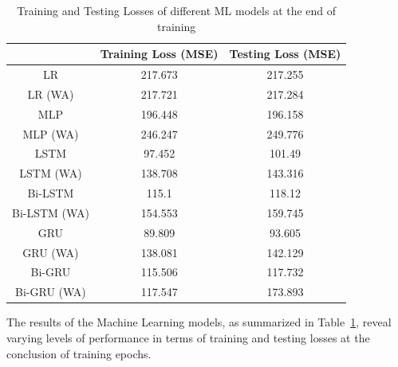 \begin{table}[p]
    \renewcommand{\arraystretch}{1.5}
    \begin{center}
        \footnotesize
        \begin{tabular}{ |c|c|c| }
            \hline
            & Training Loss (MSE)        & Testing Loss (MSE)          \\
            \hline
            LR           & \cellcolor{red!10}217.673  & \cellcolor{red!10}217.255   \\
            \hline
            LR (WA)      & \cellcolor{red!20}217.721  & \cellcolor{red!20}217.284   \\
            \hline
            MLP          & 196.448                    & 196.158                     \\
            \hline
            MLP (WA)     & \cellcolor{red!30}246.247  & \cellcolor{red!30}249.776   \\
            \hline
            LSTM         & \cellcolor{green!20}97.452 & \cellcolor{green!20}101.49  \\
            \hline
            LSTM (WA)    & 138.708                    & 143.316                     \\
            \hline
            Bi-LSTM      & \cellcolor{green!10}115.1  & 118.12                      \\
            \hline
            Bi-LSTM (WA) & 154.553                    & 159.745                     \\
            \hline
            GRU          & \cellcolor{green!30}89.809 & \cellcolor{green!30}93.605  \\
            \hline
            GRU (WA)     & 138.081                    & 142.129                     \\
            \hline
            Bi-GRU       & 115.506                    & \cellcolor{green!10}117.732 \\
            \hline
            Bi-GRU (WA)  & 117.547                    & 173.893                     \\
            \hline
        \end{tabular}
    \end{center}
    \captionsetup{format=plain, justification=centering, font=small}
    \caption{Training and Testing Losses of different ML models at the end of training}
    \label{tab:train_test_mse}
\end{table}

The results of the Machine Learning models, as summarized in Table~\ref{tab:train_test_mse}, reveal varying levels of performance in terms of training and testing losses at the conclusion of training epochs.

